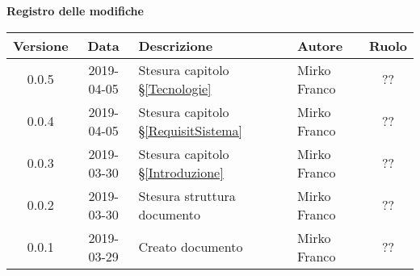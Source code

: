 	\begin{center}
		\textbf{Registro delle modifiche}
	\end{center}
	\begin{center}
		\begin{tabularx}{\textwidth}{|c|c|X|X|c|}
			\hline
			\textbf{Versione} & \textbf{Data} & \textbf{Descrizione} & \textbf{Autore} & \textbf{Ruolo} \\
			\hline
			0.0.5 & 2019-04-05 & Stesura capitolo \S\ref{Tecnologie} & Mirko Franco & ?? \\
			\hline
			0.0.4 & 2019-04-05 & Stesura capitolo \S\ref{RequisitSistema} & Mirko Franco & ?? \\
			\hline
			0.0.3 & 2019-03-30 & Stesura capitolo \S\ref{Introduzione} & Mirko Franco & ?? \\
			\hline
			0.0.2 & 2019-03-30 & Stesura struttura documento & Mirko Franco & ?? \\
			\hline
			0.0.1 & 2019-03-29 & Creato documento & Mirko Franco & ?? \\
			\hline
		\end{tabularx}
	\end{center}
\newpage